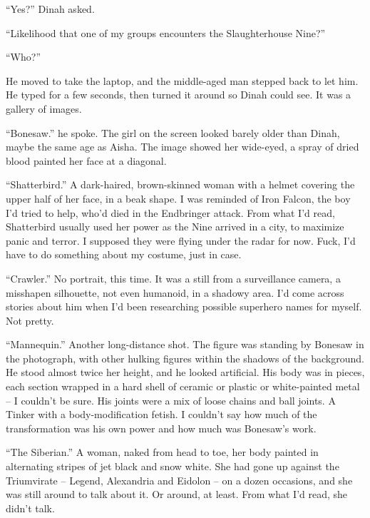 ``Yes?'' Dinah asked.



``Likelihood that one of my groups encounters the Slaughterhouse Nine?''



``Who?''



He moved to take the laptop, and the middle-aged man stepped back to let him.  He typed for a few seconds, then turned it around so Dinah could see.  It was a gallery of images.



``Bonesaw.'' he spoke.  The girl on the screen looked barely older than Dinah, maybe the same age as Aisha.  The image showed her wide-eyed, a spray of dried blood painted her face at a diagonal.



``Shatterbird.''  A dark-haired, brown-skinned woman with a helmet covering the upper half of her face, in a beak shape.  I was reminded of Iron Falcon, the boy I'd tried to help, who'd died in the Endbringer attack.  From what I'd read, Shatterbird usually used her power as the Nine arrived in a city, to maximize panic and terror.  I supposed they were flying under the radar for now.  Fuck, I'd have to do something about my costume, just in case.



``Crawler.''  No portrait, this time.  It was a still from a surveillance camera, a misshapen silhouette, not even humanoid, in a shadowy area.  I'd come across stories about him when I'd been researching possible superhero names for myself.  Not pretty.



``Mannequin.''  Another long-distance shot.  The figure was standing by Bonesaw in the photograph, with other hulking figures within the shadows of the background.  He stood almost twice her height, and he looked artificial.  His body was in pieces, each section wrapped in a hard shell of ceramic or plastic or white-painted metal – I couldn't be sure.  His joints were a mix of loose chains and ball joints.  A Tinker with a body-modification fetish.  I couldn't say how much of the transformation was his own power and how much was Bonesaw's work.



``The Siberian.''  A woman, naked from head to toe, her body painted in alternating stripes of jet black and snow white.  She had gone up against the Triumvirate – Legend, Alexandria and Eidolon – on a dozen occasions, and she was still around to talk about it.  Or around, at least.  From what I'd read, she didn't talk.



